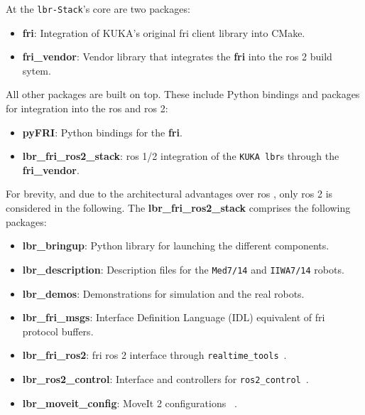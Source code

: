At the \texttt{\gls{lbr}-Stack}'s core are two packages:

\begin{itemize}
\item
  \textbf{fri}: Integration of KUKA's original \gls{fri} client library into
  CMake.
\item
  \textbf{fri\_vendor}: Vendor library that integrates the \textbf{fri}
  into the \gls{ros} 2 build sytem.
\end{itemize}

All other packages are built on top. These include Python bindings and
packages for integration into the \gls{ros} and \gls{ros}
2:

\begin{itemize}
\item
  \textbf{pyFRI}: Python bindings for the \textbf{fri}.
\item
  \textbf{lbr\_fri\_ros2\_stack}: \gls{ros} 1/2 integration of the
  \texttt{KUKA\ \gls{lbr}}s through the \textbf{fri\_vendor}.
\end{itemize}

For brevity, and due to the architectural advantages over \gls{ros}
\cite{ref-ros2}, only \gls{ros} 2 is
considered in the following. The \textbf{lbr\_fri\_ros2\_stack}
comprises the following packages:

\begin{itemize}
\item
  \textbf{lbr\_bringup}: Python library for launching the different
  components.
\item
  \textbf{lbr\_description}: Description files for the \texttt{Med7/14}
  and \texttt{IIWA7/14} robots.
\item
  \textbf{lbr\_demos}: Demonstrations for simulation and the real
  robots.
\item
  \textbf{lbr\_fri\_msgs}: Interface Definition Language (IDL)
  equivalent of \gls{fri} protocol buffers.
\item
  \textbf{lbr\_fri\_ros2}: \gls{fri} \gls{ros} 2 interface through
  \texttt{realtime\_tools}~\cite{ref-ros_control}.
\item
  \textbf{lbr\_ros2\_control}: Interface and controllers for
  \texttt{ros2\_control}~\cite{ref-ros2_control}.
\item
  \textbf{lbr\_moveit\_config}: MoveIt 2 configurations
 ~\cite{ref-moveit}.
\end{itemize}

